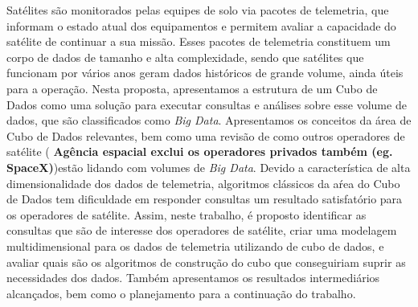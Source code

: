 
\begin{resumo}

\hypertarget{estilo:resumo}{} %

Satélites são monitorados pelas equipes de solo via pacotes de telemetria, que informam o estado atual dos equipamentos e permitem avaliar a capacidade do satélite de continuar a sua missão.
Esses pacotes de telemetria constituem um corpo de dados de tamanho e alta complexidade, sendo que satélites que funcionam por vários anos geram dados históricos de grande volume, ainda úteis para a operação.
Nesta proposta, apresentamos a estrutura de um Cubo de Dados como uma solução para executar consultas e análises sobre esse volume de dados, que são classificados como \textit{Big Data}.
Apresentamos os conceitos da área de Cubo de Dados relevantes, bem como uma revisão de como outros operadores de satélite ({\color{red} \bfseries Agência espacial exclui os operadores privados também (eg. SpaceX)})estão lidando com volumes de \textit{Big Data}.
Devido a característica de alta dimensionalidade dos dados de telemetria, algoritmos clássicos da aŕea do Cubo de Dados tem dificuldade em responder consultas um resultado satisfatório para os operadores de satélite.
Assim, neste trabalho, é proposto identificar as consultas que são de interesse dos operadores de satélite, criar uma modelagem multidimensional para os dados de telemetria utilizando de cubo de dados, e avaliar quais são os algoritmos de construção do cubo que conseguiriam suprir as necessidades dos dados.
Também apresentamos os resultados intermediários alcançados, bem como o planejamento para a continuação do trabalho.


\end{resumo}
